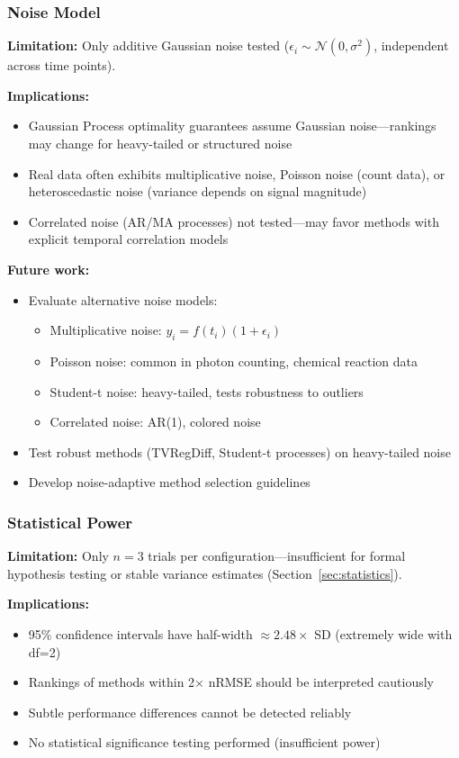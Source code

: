\subsubsection{Noise Model}

\textbf{Limitation:} Only additive Gaussian noise tested ($\epsilon_i \sim \mathcal{N}(0, \sigma^2)$, independent across time points).

\textbf{Implications:}
\begin{itemize}
    \item Gaussian Process optimality guarantees assume Gaussian noise—rankings may change for heavy-tailed or structured noise
    \item Real data often exhibits multiplicative noise, Poisson noise (count data), or heteroscedastic noise (variance depends on signal magnitude)
    \item Correlated noise (AR/MA processes) not tested—may favor methods with explicit temporal correlation models
\end{itemize}

\textbf{Future work:}
\begin{itemize}
    \item Evaluate alternative noise models:
    \begin{itemize}
        \item Multiplicative noise: $y_i = f(t_i)(1 + \epsilon_i)$
        \item Poisson noise: common in photon counting, chemical reaction data
        \item Student-t noise: heavy-tailed, tests robustness to outliers
        \item Correlated noise: AR(1), colored noise
    \end{itemize}
    \item Test robust methods (TVRegDiff, Student-t processes) on heavy-tailed noise
    \item Develop noise-adaptive method selection guidelines
\end{itemize}

\subsubsection{Statistical Power}

\textbf{Limitation:} Only $n=3$ trials per configuration—insufficient for formal hypothesis testing or stable variance estimates (Section~\ref{sec:statistics}).

\textbf{Implications:}
\begin{itemize}
    \item 95\% confidence intervals have half-width $\approx 2.48 \times$ SD (extremely wide with df=2)
    \item Rankings of methods within 2$\times$ nRMSE should be interpreted cautiously
    \item Subtle performance differences cannot be detected reliably
    \item No statistical significance testing performed (insufficient power)
\end{itemize}

